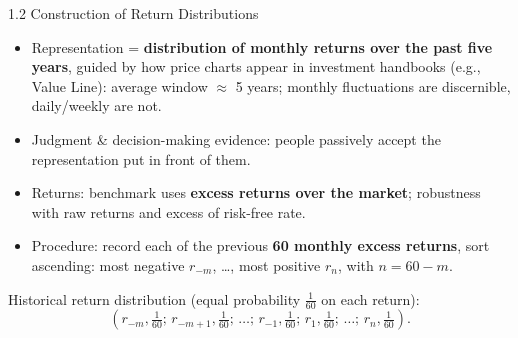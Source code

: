 \documentclass[aspectratio=169, 11pt]{beamer}
\begin{document}
\begin{frame}{1.2 Construction of Return Distributions}
\begin{itemize}
  \item Representation = \textbf{distribution of monthly returns over the past five years}, guided by how price charts appear in investment handbooks (e.g., Value Line): average window $\approx$ 5 years; monthly fluctuations are discernible, daily/weekly are not.
  \item Judgment \& decision-making evidence: people passively accept the representation put in front of them.
  \item Returns: benchmark uses \textbf{excess returns over the market}; robustness with raw returns and excess of risk-free rate.
  \item Procedure: record each of the previous \textbf{60 monthly excess returns}, sort ascending: most negative $r_{-m}$, \ldots, most positive $r_n$, with $n=60-m$.
\end{itemize}
\vspace{0.3em}
Historical return distribution (equal probability $\tfrac{1}{60}$ on each return):
\begin{equation}
\left(r_{-m},\tfrac{1}{60};\, r_{-m+1},\tfrac{1}{60};\, \ldots;\, r_{-1},\tfrac{1}{60};\, r_{1},\tfrac{1}{60};\, \ldots;\, r_{n},\tfrac{1}{60}\right).
\tag{7}
\end{equation}
\end{frame}
\end{document}
